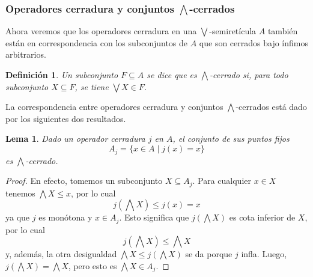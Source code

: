 \documentclass[12pt,letterpaper,titlepage]{article}
\newtheorem*{defn}{Definición}
\newtheorem{lemma}{Lema}
\theoremstyle{definition}
\newcommand\Sup{\bigvee}
\newcommand\Inf{\bigwedge}
\newcommand\tps[2]{\texorpdfstring{#1}{#2}}
\newcommand\<{\langle}
\renewcommand\>{\rangle}
\begin{document}
\subsubsection{Operadores cerradura y conjuntos \tps{$\Inf$}{Inf}-cerrados}

Ahora veremos que los operadores cerradura en una $\Sup$-semiretícula $A$
también están en correspondencia con los subconjuntos de $A$ que son cerrados
bajo ínfimos arbitrarios.

\begin{defn}
    Un subconjunto $F\subseteq A$ se dice que es $\Inf$-cerrado si,
    para todo subconjunto $X\subseteq F$, se tiene $\Sup X\in F$.
\end{defn}

La correspondencia entre operadores cerradura y conjuntos $\Inf$-cerrados
está dado por los siguientes dos resultados.

\begin{lemma}
Dado un operador cerradura $j$ en $A$, el conjunto de sus puntos fijos
\[
    A_j = \{x\in A \mid j(x) = x\}
\]
es $\Inf$-cerrado.
\end{lemma}
\begin{proof}
En efecto, tomemos un subconjunto $X\subseteq A_j$.
Para cualquier $x\in X$ tenemos $\Inf X\leq x$, por lo cual
\[
    j(\Inf X) \leq j(x) = x
\]
ya que $j$ es monótona y $x\in A_j$.
Esto significa que $j(\Inf X)$ es cota inferior de $X$, por lo cual
\[
    j(\Inf X)\leq \Inf X
\]
y, además, la otra desigualdad $\Inf X\leq j(\Inf X)$ se da porque $j$ infla.
Luego, $j(\Inf X) = \Inf X$, pero esto es $\Inf X \in A_j$.
\end{proof}
\end{document}
